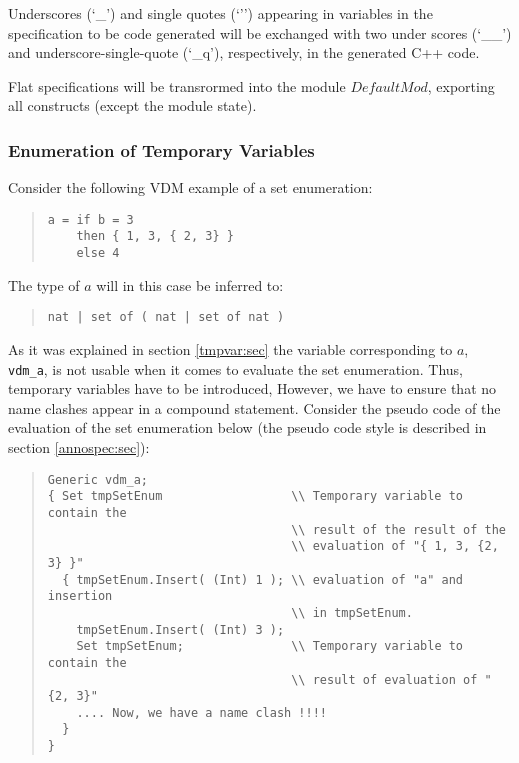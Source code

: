 \documentclass[a4paper,dvips]{article}
\begin{document}
Underscores (`\_') and single quotes (`'') appearing in variables in
the specification to be code generated will be exchanged with two
under scores (`\_\_') and underscore-single-quote (`\_q'),
respectively, in the generated C++ code.

Flat specifications will be transrormed into the module $DefaultMod$,
exporting all constructs (except the module state).



\subsubsection{Enumeration of Temporary Variables}

Consider the following VDM example of a set enumeration:

\begin{quote}
\begin{verbatim}
a = if b = 3 
    then { 1, 3, { 2, 3} }
    else 4
\end{verbatim}
\end{quote}

The type of $a$ will in this case be inferred to:

\begin{quote}
\begin{verbatim}
nat | set of ( nat | set of nat )
\end{verbatim}
\end{quote}

As it was explained in section \ref{tmpvar:sec} the variable
corresponding to $a$, {\tt vdm\_a}, is not usable when it comes to
evaluate the set enumeration. Thus, temporary variables have to be
introduced, However, we have to ensure that no name clashes appear in
a compound statement. Consider the pseudo code of the evaluation of
the set enumeration below (the pseudo code style is described in
section \ref{annospec:sec}):

\begin{quote}
\begin{verbatim}
Generic vdm_a;
{ Set tmpSetEnum                  \\ Temporary variable to contain the
                                  \\ result of the result of the
                                  \\ evaluation of "{ 1, 3, {2, 3} }"
  { tmpSetEnum.Insert( (Int) 1 ); \\ evaluation of "a" and insertion
                                  \\ in tmpSetEnum.
    tmpSetEnum.Insert( (Int) 3 ); 
    Set tmpSetEnum;               \\ Temporary variable to contain the
                                  \\ result of evaluation of "{2, 3}"
    .... Now, we have a name clash !!!!
  }
}
\end{verbatim}
\end{quote}
\end{document}
